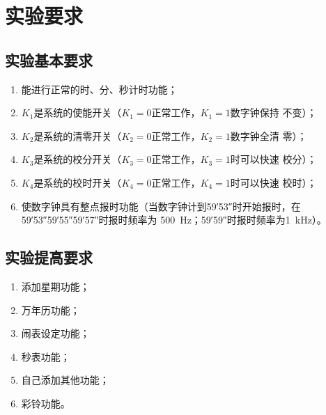 \documentclass[twoside, openright]{article}
\begin{document}


\setcounter{tocdepth}{2}

\renewcommand{\contentsname}{\zihao{3}\heiti 目次}
\tableofcontents
\listoffigures
\listoftables

\newpage
{}


\section{实验要求}%
\label{sec:实验要求}

\subsection{实验基本要求}%
\label{sub:实验基本要求}

\begin{enumerate}

	\item 能进行正常的时、分、秒计时功能；

	\item $ K_1 $是系统的使能开关（$ K_1 = 0$正常工作，$ K_1 = 1$数字钟保持
		不变）；

	\item $ K_2 $是系统的清零开关（$ K_2 = 0$正常工作，$ K_2 = 1$数字钟全清
		零）；

	\item $ K_3 $是系统的校分开关（$ K_3 = 0$正常工作，$ K_3 = 1$时可以快速
		校分）；

	\item $ K_4 $是系统的校时开关（$ K_4 = 0$正常工作，$ K_4 = 1$时可以快速
		校时）；

	\item 使数字钟具有整点报时功能（当数字钟计到\ang{;59;53}时开始报时，在
		\ang{;59;53}\ang{;59;55}\ang{;59;57}时报时频率为
		\SI{500}{\Hz}；\ang{;59;59}时报时频率为\SI{1}{\kHz}）。

\end{enumerate}

\subsection{实验提高要求}%
\label{sub:实验提高要求}

\begin{enumerate}

	\item 添加星期功能；

	\item 万年历功能；

	\item 闹表设定功能；

	\item 秒表功能；

	\item 自己添加其他功能；

	\item 彩铃功能。

\end{enumerate}
\end{document}
